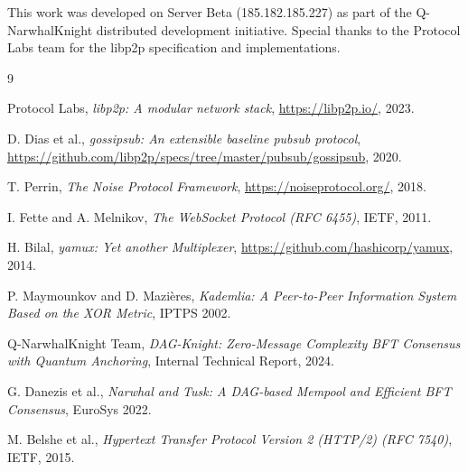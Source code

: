 \documentclass[11pt,a4paper]{article}
\begin{document}
This work was developed on Server Beta (185.182.185.227) as part of the Q-NarwhalKnight distributed development initiative. Special thanks to the Protocol Labs team for the libp2p specification and implementations.

\begin{thebibliography}{9}

Protocol Labs,
\textit{libp2p: A modular network stack},
\url{https://libp2p.io/}, 2023.

D. Dias et al.,
\textit{gossipsub: An extensible baseline pubsub protocol},
\url{https://github.com/libp2p/specs/tree/master/pubsub/gossipsub}, 2020.

T. Perrin,
\textit{The Noise Protocol Framework},
\url{https://noiseprotocol.org/}, 2018.

I. Fette and A. Melnikov,
\textit{The WebSocket Protocol (RFC 6455)},
IETF, 2011.

H. Bilal,
\textit{yamux: Yet another Multiplexer},
\url{https://github.com/hashicorp/yamux}, 2014.

P. Maymounkov and D. Mazi\`{e}res,
\textit{Kademlia: A Peer-to-Peer Information System Based on the XOR Metric},
IPTPS 2002.

Q-NarwhalKnight Team,
\textit{DAG-Knight: Zero-Message Complexity BFT Consensus with Quantum Anchoring},
Internal Technical Report, 2024.

G. Danezis et al.,
\textit{Narwhal and Tusk: A DAG-based Mempool and Efficient BFT Consensus},
EuroSys 2022.

M. Belshe et al.,
\textit{Hypertext Transfer Protocol Version 2 (HTTP/2) (RFC 7540)},
IETF, 2015.

\end{thebibliography}
\end{document}
